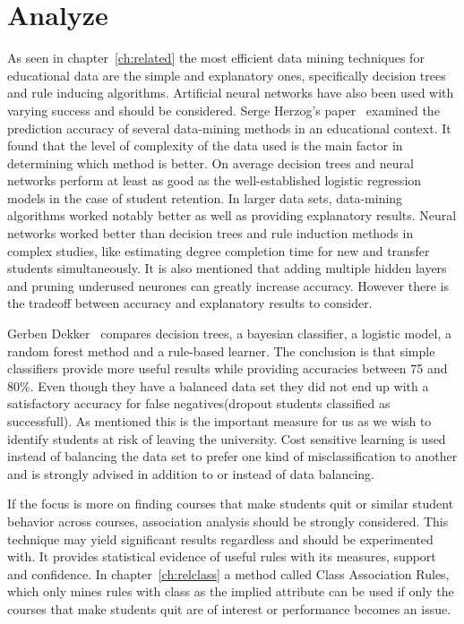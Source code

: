 \section{Analyze}
As seen in chapter~\ref{ch:related} the most efficient data mining techniques for educational data are the simple and explanatory ones,
specifically decision trees and rule inducing algorithms.
Artificial neural networks have also been used with varying success and should be considered.
Serge Herzog's paper~\cite{2} examined the prediction accuracy of several data-mining methods in an educational context.
It found that the level of complexity of the data used is the main factor in determining which method is better.
On average decision trees and neural networks perform at least as good as the well-established logistic regression models in the case of student retention.
In larger data sets, data-mining algorithms worked notably better as well as providing explanatory results. 
Neural networks worked better than decision trees and rule induction methods in complex studies, like estimating degree completion time for new and transfer students simultaneously. 
It is also mentioned that adding multiple hidden layers and pruning underused neurones can greatly increase accuracy. 
However there is the tradeoff between accuracy and explanatory results to consider. 

\bigskip\noindent
Gerben Dekker~\cite{7} compares decision trees, a bayesian classifier, a logistic model, a random forest method and a rule-based learner.
The conclusion is that simple classifiers provide more useful results while providing accuracies between 75 and 80\%.
Even though they have a balanced data set they did not end up with a satisfactory accuracy for  false negatives(dropout students classified as successfull). As mentioned this is the important measure for us as we wish to identify students at risk of leaving the university. Cost sensitive learning is used instead of balancing the data set to prefer one kind of misclassification to another and is strongly advised in addition to or instead of data balancing.  

\bigskip\noindent
If the focus is more on finding courses that make students quit or similar student behavior across courses, association analysis should be strongly considered. This technique may yield significant results regardless and should be experimented with. It provides statistical evidence of useful rules with its measures, support and confidence. In chapter~\ref{ch:relclass} a method called Class Association Rules, which only mines rules with class as the implied attribute can be used if only the courses that make students quit are of interest or performance becomes an issue.


